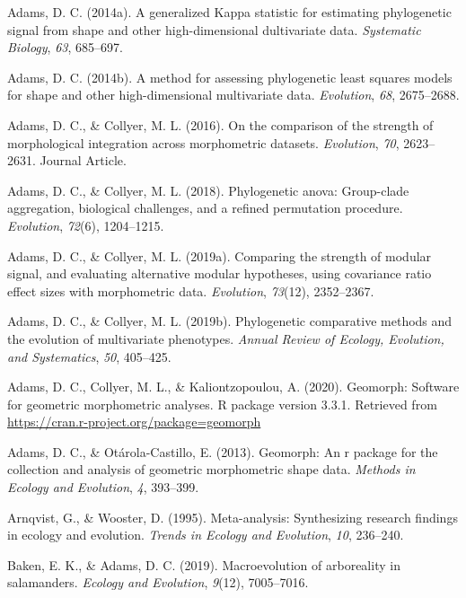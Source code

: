 \documentclass[
]{article}
\begin{document}
\leavevmode\hypertarget{ref-Adams2014a}{}%
Adams, D. C. (2014a). A generalized Kappa statistic for estimating
phylogenetic signal from shape and other high-dimensional dultivariate
data. \emph{Systematic Biology}, \emph{63}, 685--697.

\leavevmode\hypertarget{ref-Adams2014b}{}%
Adams, D. C. (2014b). A method for assessing phylogenetic least squares
models for shape and other high-dimensional multivariate data.
\emph{Evolution}, \emph{68}, 2675--2688.

\leavevmode\hypertarget{ref-AdamsCollyer2016}{}%
Adams, D. C., \& Collyer, M. L. (2016). On the comparison of the
strength of morphological integration across morphometric datasets.
\emph{Evolution}, \emph{70}, 2623--2631. Journal Article.

\leavevmode\hypertarget{ref-AdamsCollyer2018b}{}%
Adams, D. C., \& Collyer, M. L. (2018). Phylogenetic anova: Group-clade
aggregation, biological challenges, and a refined permutation procedure.
\emph{Evolution}, \emph{72}(6), 1204--1215.

\leavevmode\hypertarget{ref-AdamsCollyer2019b}{}%
Adams, D. C., \& Collyer, M. L. (2019a). Comparing the strength of
modular signal, and evaluating alternative modular hypotheses, using
covariance ratio effect sizes with morphometric data. \emph{Evolution},
\emph{73}(12), 2352--2367.

\leavevmode\hypertarget{ref-AdamsCollyer2019}{}%
Adams, D. C., \& Collyer, M. L. (2019b). Phylogenetic comparative
methods and the evolution of multivariate phenotypes. \emph{Annual
Review of Ecology, Evolution, and Systematics}, \emph{50}, 405--425.

\leavevmode\hypertarget{ref-AdamsGeomorph}{}%
Adams, D. C., Collyer, M. L., \& Kaliontzopoulou, A. (2020). Geomorph:
Software for geometric morphometric analyses. R package version 3.3.1.
Retrieved from \url{https://cran.r-project.org/package=geomorph}

\leavevmode\hypertarget{ref-AdamsOtarola2013}{}%
Adams, D. C., \& Otárola-Castillo, E. (2013). Geomorph: An r package for
the collection and analysis of geometric morphometric shape data.
\emph{Methods in Ecology and Evolution}, \emph{4}, 393--399.

\leavevmode\hypertarget{ref-Arnqvist1995}{}%
Arnqvist, G., \& Wooster, D. (1995). Meta-analysis: Synthesizing
research findings in ecology and evolution. \emph{Trends in Ecology and
Evolution}, \emph{10}, 236--240.

\leavevmode\hypertarget{ref-Baken2019}{}%
Baken, E. K., \& Adams, D. C. (2019). Macroevolution of arboreality in
salamanders. \emph{Ecology and Evolution}, \emph{9}(12), 7005--7016.
\end{document}
